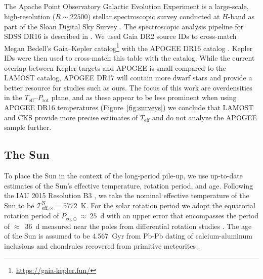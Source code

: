 \documentclass[linenumbers,trackchanges,twocolumn]{aastex631}
\newcommand{\teff}{\ensuremath{T_{\mathrm{eff}}}\xspace}
\newcommand{\prot}{\ensuremath{P_\mathrm{rot}}\xspace}
\begin{document}
\subsection{}
The Apache Point Observatory Galactic Evolution Experiment \citep[APOGEE;][]{Majewski2017} is a large-scale, high-resolution ($R \sim 22500$) stellar spectroscopic survey conducted at $H$-band as part of the Sloan Digital Sky Survey \citep[SDSS-IV;][]{Blanton2017}. The spectroscopic analysis pipeline for SDSS DR16 is described in \citet{Jonsson2020}. We used Gaia DR2 source IDs \citep{Gaia2016, Gaia2018} to cross-match Megan Bedell's Gaia--Kepler catalog\footnote{\url{https://gaia-kepler.fun/}} with the APOGEE DR16 catalog \citep{Ahumada2020}. Kepler IDs were then used to cross-match this table with the \citet{McQuillan2014} catalog. While the current overlap between Kepler targets and APOGEE is small compared to the LAMOST catalog, APOGEE DR17 will contain more dwarf stars and provide a better resource for studies such as ours. The focus of this work are overdensities in the \teff--\prot plane, and as these appear to be less prominent when using  APOGEE DR16 temperatures (Figure~\ref{fig:surveys}) we conclude that LAMOST and CKS provide more precise estimates of \teff and do not analyze the APOGEE sample further. 

\subsection{The Sun}
To place the Sun in the context of the long-period pile-up, we use up-to-date estimates of the Sun's effective temperature, rotation period, and age. Following the IAU 2015 Resolution B3 \citep{Prsa2016}, we take the nominal effective temperature of the Sun to be $\mathcal{T}^\mathrm{N}_\mathrm{eff,\odot} = 5772$~K. For the solar rotation period we adopt the equatorial rotation period of $P_\mathrm{eq,\odot}~\approx~25$~d with an upper error that encompasses the period of $\approx$~36~d measured near the poles from differential rotation studies \citep[][and references therein]{Thompson2003}.  The age of the Sun is assumed to be 4.567~Gyr from Pb-Pb dating of calcium-aluminum inclusions and chondrules recovered from primitive meteorites \citep[][and references therein]{Bahcall1995}.
\end{document}
